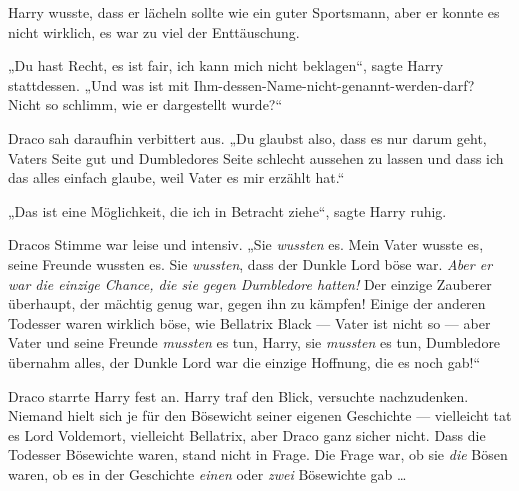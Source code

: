 Harry wusste, dass er lächeln sollte wie ein guter Sportsmann, aber er konnte es nicht wirklich, es war zu viel der Enttäuschung.

„Du hast Recht, es ist fair, ich kann mich nicht beklagen“, sagte Harry stattdessen.
„Und was ist mit Ihm-dessen-Name-nicht-genannt-werden-darf? Nicht so schlimm, wie er dargestellt wurde?“

Draco sah daraufhin verbittert aus.
„Du glaubst also, dass es nur darum geht, Vaters Seite gut und Dumbledores Seite schlecht aussehen zu lassen und dass ich das alles einfach glaube, weil Vater es mir erzählt hat.“

„Das ist eine Möglichkeit, die ich in Betracht ziehe“, sagte Harry ruhig.

Dracos Stimme war leise und intensiv.
„Sie \emph{wussten} es. Mein Vater wusste es, seine Freunde wussten es. Sie \emph{wussten}, dass der Dunkle Lord böse war. \emph{Aber er war die einzige Chance, die sie gegen Dumbledore hatten!} Der einzige Zauberer überhaupt, der mächtig genug war, gegen ihn zu kämpfen! Einige der anderen Todesser waren wirklich böse, wie Bellatrix Black — Vater ist nicht so — aber Vater und seine Freunde \emph{mussten} es tun, Harry, sie \emph{mussten} es tun, Dumbledore übernahm alles, der Dunkle Lord war die einzige Hoffnung, die es noch gab!“

Draco starrte Harry fest an. Harry traf den Blick, versuchte nachzudenken. Niemand hielt sich je für den Bösewicht seiner eigenen Geschichte — vielleicht tat es Lord Voldemort, vielleicht Bellatrix, aber Draco ganz sicher nicht. Dass die Todesser Bösewichte waren, stand nicht in Frage. Die Frage war, ob sie \emph{die} Bösen waren, ob es in der Geschichte \emph{einen} oder \emph{zwei} Bösewichte gab …

